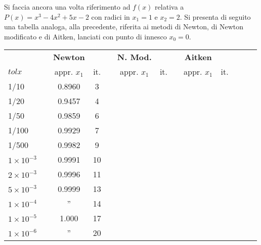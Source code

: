 Si faccia ancora una volta riferimento ad \(f(x)\) relativa a \(P(x)=x^3 - 4x^2 + 5x - 2\) con radici in \(x_1=1\) e \(x_2=2\). Si presenta di seguito una tabella analoga, alla precedente, riferita ai metodi di Newton, di Newton modificato e di Aitken, lanciati con punto di innesco \(x_0 = 0\).\\

\begin{tabular}{l*{12}{c}}
 & \vline& \textbf{Newton} & & \vline& \textbf{N. Mod.} & & \vline& \textbf{Aitken} \\
 \(tolx\) & \vline& appr. \(x_1\) & it. & \vline& appr. \(x_1\) & it.& \vline& appr. \(x_1\) & it.\\
\hline
 1/10 & \vline& 0.8960 & 3\\
 1/20 & \vline& 0.9457 & 4\\
 1/50 & \vline& 0.9859 & 6\\
 1/100 & \vline& 0.9929& 7\\
 1/500 & \vline& 0.9982& 9\\
 \(1 \times 10^{-3}\) & \vline& 0.9991 & 10\\
 \(2 \times 10^{-3}\) & \vline& 0.9996 & 11\\
 \(5 \times 10^{-3}\) & \vline& 0.9999 & 13\\
 \(1 \times 10^{-4}\) & \vline& '' & 14\\
 \(1 \times 10^{-5}\) & \vline& 1.000 & 17\\
 \(1 \times 10^{-6}\) & \vline& '' & 20\\
\end{tabular} \\

